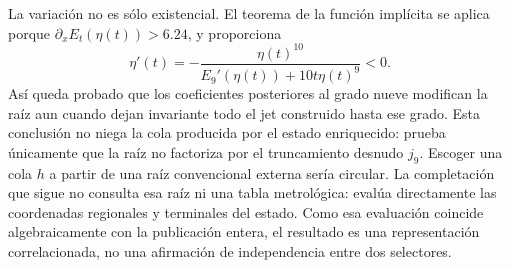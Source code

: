 La variación no es sólo existencial. El teorema de la función implícita se
aplica porque \(\partial_xE_t(\eta(t))>6.24\), y proporciona
\begin{equation}
 \eta'(t)=-
 \frac{\eta(t)^{10}}
 {E_9'(\eta(t))+10t\eta(t)^9}<0.
 \label{eq:alpha-variacion-raiz-prolongacion}
\end{equation}
Así queda probado que los coeficientes posteriores al grado nueve modifican
la raíz aun cuando dejan invariante todo el jet construido hasta ese grado.
Esta conclusión no niega la cola producida por el estado enriquecido: prueba
únicamente que la raíz no factoriza por el truncamiento desnudo
\(j_9\). Escoger una cola \(h\) a partir de una raíz convencional externa
sería circular. La completación que sigue no consulta esa raíz ni una tabla
metrológica: evalúa directamente las coordenadas regionales y terminales del
estado. Como esa evaluación coincide algebraicamente con la publicación
entera, el resultado es una representación correlacionada, no una afirmación
de independencia entre dos selectores.


\endinput

\subsubsection{Lector completo, naturalidad y cilindros comunes}

Sea \(F_{\mathsf s}\) el cuerpo de coeficientes de la firma de
\(\mathsf s\in\mathcal X_\alpha^{\mathrm{enr}}\) y sea \(d_m=6+3m\). Se
definen
\[
 \mathfrak J_m:=\coprod_{\mathsf s\in\mathcal X_\alpha^{\mathrm{enr}}}
 \{\mathsf s\}\times F_{\mathsf s}[X]/(X^{d_m+1}),\qquad
 \Gamma_m(\mathsf s)=
 \bigl(\mathsf s,E_{21/22}^{(d_m)}(\mathsf s;X)\bigr).
\]
El lector completo registrado \(\Gamma_{E21}\) produce estas publicaciones.
Para \(m'\ge m\), el truncamiento
\(
 \tau_{m',m}(\mathsf s,[f]_{d_{m'}})
 =(\mathsf s,[f]_{d_m})
\)
satisface
\begin{equation}
 \tau_{m',m}\circ\Gamma_{m'}=\Gamma_m,
 \qquad
 E_{21/22}:=\varprojlim_mE_{21/22}^{(d_m)}.
 \tag{A3}
 \label{eq:alpha-sistema-analitico-completo}
\end{equation}
No se añade una sección del truncamiento desnudo. Si se explicita la
publicación de los tres coeficientes siguientes, ésta es la proyección
derivada
\[
 \Lambda_{d_m+1:d_m+3}
 :=\operatorname{pr}_{d_m+1:d_m+3}\circ
   \Gamma_{E21}\circ\mathcal U_{\mathrm{TPK}},
\]
no un generador independiente ni una lectura del valor objetivo.

